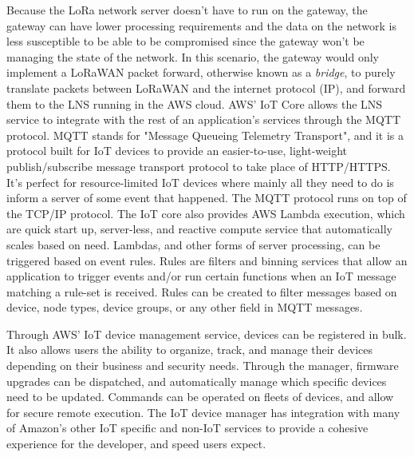 Because the LoRa network server doesn't have to run on the gateway, the gateway
can have lower processing requirements and the data on the network is  less
susceptible to be able to be compromised since the gateway won't be managing the
state of the network. In this scenario, the gateway would only implement a
LoRaWAN packet forward, otherwise known as a \emph{bridge}, to purely translate
packets between LoRaWAN and the internet protocol (IP), and forward them to the
LNS running in the AWS cloud. AWS' IoT Core allows the LNS service to integrate
with the rest of an application's services through the MQTT protocol. MQTT
stands for "Message Queueing Telemetry Transport", and it is a protocol built
for IoT devices to provide an easier-to-use, light-weight publish/subscribe
message transport protocol to take place of HTTP/HTTPS. It's perfect for
resource-limited IoT devices where mainly all they need to do is inform a server
of some event that happened. The MQTT protocol runs on top of the TCP/IP
protocol. The IoT core also provides AWS Lambda execution, which are quick start
up, server-less, and reactive compute service that automatically scales based on
need. Lambdas, and other forms of server processing, can be triggered based on
event rules. Rules are filters and binning services that allow an application to
trigger events and/or run certain functions when an IoT message matching a
rule-set is received. Rules can be created to filter messages based on device,
node types, device groups, or any other field in MQTT messages.


Through AWS' IoT device management service, devices can be registered in bulk.
It also allows users the ability to organize, track, and manage their devices
depending on their business and security needs. Through the manager, firmware
upgrades can be dispatched, and automatically manage which specific devices need
to be updated. Commands can be operated on fleets of devices, and allow for
secure remote execution. The IoT device manager has integration with many of
Amazon's other IoT specific and non-IoT services to provide a cohesive
experience for the developer, and speed users expect.



